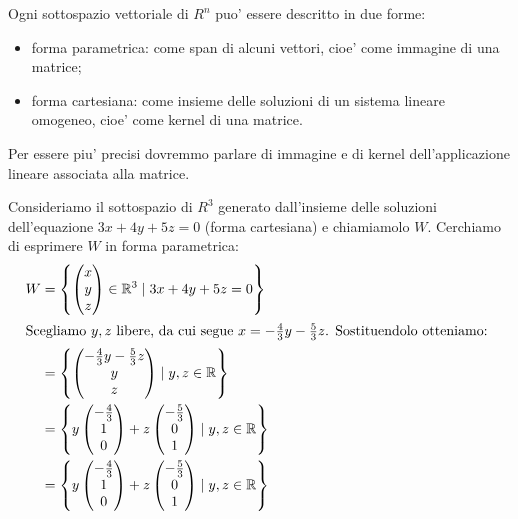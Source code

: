 \begin{proposition}
    Ogni sottospazio vettoriale di $R^n$ puo' essere descritto in due forme:
    \begin{itemize}
        \item forma parametrica: come span di alcuni vettori, cioe' come immagine di una matrice;
        \item forma cartesiana: come insieme delle soluzioni di un sistema lineare omogeneo, cioe' come kernel di una matrice.
    \end{itemize}
\end{proposition}
\begin{remark}
    Per essere piu' precisi dovremmo parlare di immagine e di kernel dell'applicazione lineare associata alla matrice. 
\end{remark}
\begin{example}
    Consideriamo il sottospazio di $R^3$ generato dall'insieme delle soluzioni dell'equazione $3x + 4y + 5z = 0$ (forma cartesiana) e chiamiamolo $W$.
    Cerchiamo di esprimere $W$ in forma parametrica: \begin{alignat*}{1}
        W &= \left\{ \begin{pmatrix} x \\ y \\ z \end{pmatrix} \in \R^3 \mid 3x + 4y + 5z = 0\right\} \\
        \intertext{Scegliamo $y, z$ libere, da cui segue $x = -\frac{4}{3}y -\frac{5}{3}z$. Sostituendolo otteniamo: }
        &= \left\{ \begin{pmatrix} -\frac{4}{3}y -\frac{5}{3}z \\ y \\ z \end{pmatrix} \mid y, z \in \R \right\}\\
        &= \left\{ y\begin{pmatrix} -\frac{4}{3} \\ 1 \\ 0 \end{pmatrix} + z\begin{pmatrix} -\frac{5}{3} \\ 0 \\ 1 \end{pmatrix} \mid y, z \in \R \right\}\\
        &= \left\{ y\begin{pmatrix} -\frac{4}{3} \\ 1 \\ 0 \end{pmatrix} + z\begin{pmatrix} -\frac{5}{3} \\ 0 \\ 1 \end{pmatrix} \mid y, z \in \R \right\}\\

\end{alignat*}
\end{example}
